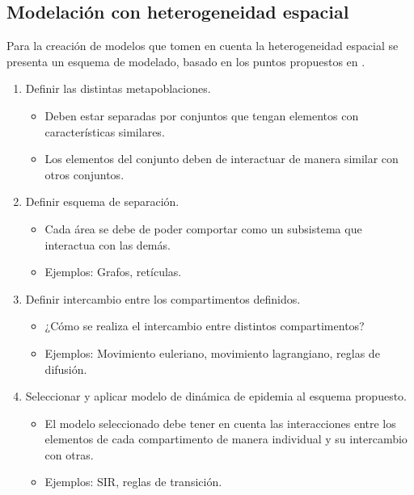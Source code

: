 \documentclass[fleqn,10pt]{SelfArx_063318} %
\begin{document}
\subsection{Modelación con heterogeneidad espacial}

Para la creación de modelos que tomen en cuenta la heterogeneidad espacial se presenta un esquema de modelado, basado
en los puntos propuestos en \cite{mainPresentation}.

\begin{enumerate}
    \item Definir las distintas metapoblaciones.
          \begin{itemize}
              \item Deben estar separadas por conjuntos que tengan elementos con características similares.
              \item Los elementos del conjunto deben de interactuar de manera similar con otros conjuntos.
          \end{itemize}
    \item Definir esquema de separación.
          \begin{itemize}
              \item Cada área se debe de poder comportar como un subsistema que interactua con las demás.
              \item Ejemplos: Grafos, retículas.
          \end{itemize}
    \item Definir intercambio entre los compartimentos definidos.
          \begin{itemize}
              \item ¿Cómo se realiza el intercambio entre distintos compartimentos?
              \item Ejemplos: Movimiento euleriano, movimiento lagrangiano, reglas de difusión.
          \end{itemize}
    \item Seleccionar y aplicar modelo de dinámica de epidemia al esquema propuesto.
          \begin{itemize}
              \item El modelo seleccionado debe tener en cuenta las interacciones entre los elementos de cada
                    compartimento de manera individual y su intercambio con otras.
              \item Ejemplos: SIR, reglas de transición.
          \end{itemize}
\end{enumerate}
\end{document}
